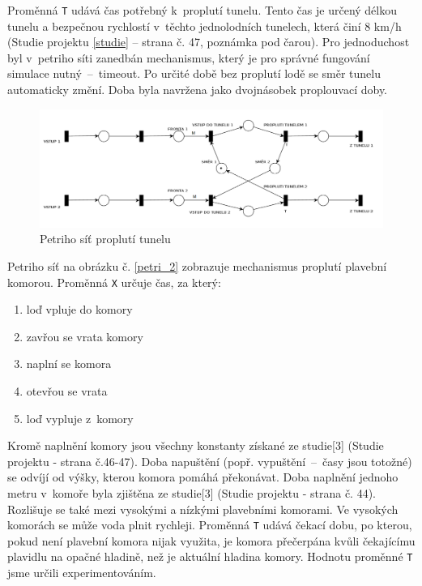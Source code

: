 \documentclass[11pt,a4paper]{article}
\begin{document}
      Proměnná \texttt{T} udává čas potřebný k~proplutí tunelu.
      Tento čas je určený délkou tunelu a bezpečnou
      rychlostí v~těchto jednolodních tunelech, která činí
      8 km/h (Studie projektu \ref{studie} -- strana č. 47, poznámka pod čarou).
      Pro jednoduchost byl v~petriho síti zanedbán mechanismus, který je pro správné
      fungování simulace nutný \,--\, timeout. Po určité době bez proplutí lodě
      se směr tunelu automaticky změní. Doba byla navržena jako dvojnásobek
      proplouvací doby.

      \begin{figure}[H]
        \centering
        \includegraphics[width=1\textwidth, natwidth=940, natheight=325]
                        {petri_net_1.png}
        \caption{Petriho síť proplutí tunelu} \label{petri_1}
      \end{figure}

      \break

      Petriho síť na obrázku č. \ref{petri_2} zobrazuje mechanismus proplutí
      plavební komorou. Proměnná \texttt{X} určuje čas, za který:

      \begin{enumerate}
        \item loď vpluje do komory
        \item zavřou se vrata komory
        \item naplní se komora
        \item otevřou se vrata
        \item loď vypluje z~komory
      \end{enumerate}

      Kromě naplnění komory jsou všechny konstanty získané ze
      studie[3] (Studie projektu - strana č.46-47).
      Doba napuštění (popř. vypuštění \,--\, časy jsou totožné) se odvíjí od
      výšky, kterou komora pomáhá překonávat. Doba naplnění jednoho metru
v~komoře byla zjištěna ze studie[3] (Studie projektu - strana č. 44).
      Rozlišuje se také mezi vysokými a nízkými plavebními komorami.
      Ve vysokých komorách se může voda plnit rychleji.
      Proměnná \texttt{T} udává čekací dobu, po kterou, pokud není plavební
      komora nijak využita, je komora přečerpána kvůli čekajícímu plavidlu na
      opačné hladině, než je aktuální hladina komory. Hodnotu proměnné 
      \texttt{T} jsme určili experimentováním.
\end{document}

